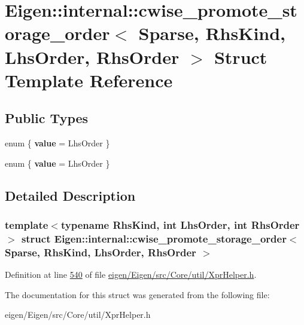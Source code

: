 \hypertarget{struct_eigen_1_1internal_1_1cwise__promote__storage__order_3_01_sparse_00_01_rhs_kind_00_01_lhs_order_00_01_rhs_order_01_4}{}\section{Eigen\+:\+:internal\+:\+:cwise\+\_\+promote\+\_\+storage\+\_\+order$<$ Sparse, Rhs\+Kind, Lhs\+Order, Rhs\+Order $>$ Struct Template Reference}
\label{struct_eigen_1_1internal_1_1cwise__promote__storage__order_3_01_sparse_00_01_rhs_kind_00_01_lhs_order_00_01_rhs_order_01_4}
\subsection*{Public Types}
\begin{DoxyCompactItemize}
\item 
\mbox{\label{struct_eigen_1_1internal_1_1cwise__promote__storage__order_3_01_sparse_00_01_rhs_kind_00_01_lhs_order_00_01_rhs_order_01_4_ac12f4b3f1fdaee22d1b2c73116118aa7}} 
enum \{ {\bfseries value} = Lhs\+Order
 \}
\item 
\mbox{\label{struct_eigen_1_1internal_1_1cwise__promote__storage__order_3_01_sparse_00_01_rhs_kind_00_01_lhs_order_00_01_rhs_order_01_4_a858f5ed2a6439c2c9978de1f059b0003}} 
enum \{ {\bfseries value} = Lhs\+Order
 \}
\end{DoxyCompactItemize}


\subsection{Detailed Description}
\subsubsection*{template$<$typename Rhs\+Kind, int Lhs\+Order, int Rhs\+Order$>$\newline
struct Eigen\+::internal\+::cwise\+\_\+promote\+\_\+storage\+\_\+order$<$ Sparse, Rhs\+Kind, Lhs\+Order, Rhs\+Order $>$}



Definition at line \hyperlink{eigen_2_eigen_2src_2_core_2util_2_xpr_helper_8h_source_l00540}{540} of file \hyperlink{eigen_2_eigen_2src_2_core_2util_2_xpr_helper_8h_source}{eigen/\+Eigen/src/\+Core/util/\+Xpr\+Helper.\+h}.



The documentation for this struct was generated from the following file\+:\begin{DoxyCompactItemize}
\item 
eigen/\+Eigen/src/\+Core/util/\+Xpr\+Helper.\+h\end{DoxyCompactItemize}
